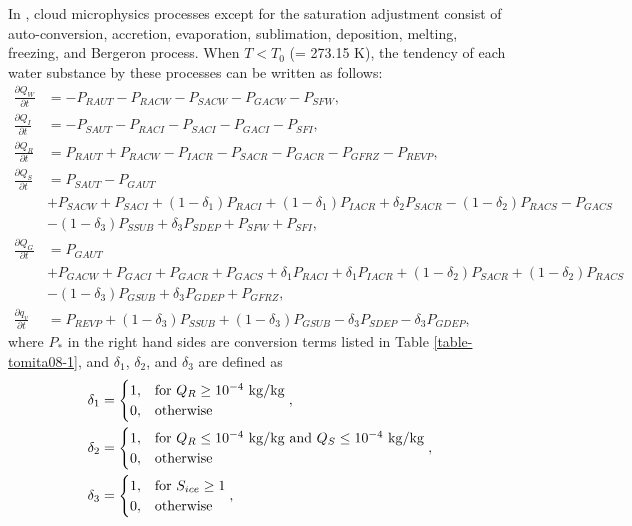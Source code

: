 In \citet{tomita_2008}, cloud microphysics processes except for the saturation adjustment consist of auto-conversion, accretion, evaporation, sublimation, deposition, melting, freezing, and Bergeron process. When $T < T_{0}$ (= 273.15 K), the tendency of each water substance by these processes can be written as follows:
\begin{align}
  \frac{\partial Q_{W}}{\partial t} &= -P_{RAUT}-P_{RACW}-P_{SACW}-P_{GACW}-P_{SFW}, \\
  \frac{\partial Q_{I}}{\partial t} &= -P_{SAUT}-P_{RACI}-P_{SACI}-P_{GACI}-P_{SFI}, \\
  \frac{\partial Q_{R}}{\partial t} &= P_{RAUT}+P_{RACW}-P_{IACR}-P_{SACR}-P_{GACR}-P_{GFRZ}-P_{REVP}, \\
  \frac{\partial Q_{S}}{\partial t} &= P_{SAUT}-P_{GAUT} \nonumber \\
  &+P_{SACW}+P_{SACI}+(1-\delta_{1})P_{RACI}+(1-\delta_{1})P_{IACR}+\delta_{2}P_{SACR}-(1-\delta_{2})P_{RACS}-P_{GACS} \nonumber \\
  &-(1-\delta_{3})P_{SSUB}+\delta_{3}P_{SDEP}+P_{SFW}+P_{SFI}, \\
  \frac{\partial Q_{G}}{\partial t} &= P_{GAUT} \nonumber \\
  &+P_{GACW}+P_{GACI}+P_{GACR}+P_{GACS}+\delta_{1}P_{RACI}+\delta_{1}P_{IACR}+(1-\delta_{2})P_{SACR}+(1-\delta_{2})P_{RACS} \nonumber \\
  &-(1-\delta_{3})P_{GSUB}+\delta_{3}P_{GDEP}+P_{GFRZ}, \\
  \frac{\partial q_{v}}{\partial t} &= P_{REVP}+(1-\delta_{3})P_{SSUB}+(1-\delta_{3})P_{GSUB}-\delta_{3}P_{SDEP}-\delta_{3}P_{GDEP},
\end{align}
where $P_{*}$ in the right hand sides are conversion terms listed in Table \ref{table-tomita08-1}, and $\delta_{1}$, $\delta_{2}$, and $\delta_{3}$ are defined as
\begin{align}
\delta_{1} &=
\begin{cases}
  1, &{\rm for\ } Q_{R} \geq 10^{-4} {\rm \ kg/kg}\\
  0, &{\rm otherwise}\\
\end{cases},
\\
\delta_{2} &=
\begin{cases}
  1, &{\rm for\ } Q_{R} \leq 10^{-4} {\rm \ kg/kg\ and\ } Q_{S} \leq 10^{-4} {\rm \ kg/kg}\\
  0, &{\rm otherwise}\\
\end{cases},
\\
\delta_{3} &=
\begin{cases}
  1, &{\rm for\ } S_{ice} \geq 1\\
  0, &{\rm otherwise}\\
\end{cases},
\end{align}
